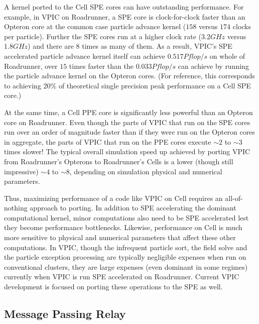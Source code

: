 \documentclass[letter,10pt]{article}
\begin{document}

A kernel ported to the Cell SPE cores can have outstanding
performance.  For example, in VPIC on Roadrunner, a SPE core is
clock-for-clock faster than an Opteron core at the common case
particle advance kernel ($158$ versus $174$ clocks per particle).
Further the SPE cores run at a higher clock rate ($3.2 GHz$ versus
$1.8 GHz$) and there are $8$ times as many of them.  As a result,
VPIC's SPE accelerated particle advance kernel itself can achieve
$0.517 Pflop/s$ on whole of Roadrunner, over $15$ times faster than
the $0.033 Pflop/s$ can achieve by running the particle advance kernel
on the Opteron cores.  (For reference, this corresponds to achieving
$20\%$ of theoretical single precision peak performance on a Cell SPE
core.)

At the same time, a Cell PPE core is significantly less powerful than
an Opteron core on Roadrunner.  Even though the parts of VPIC that run
on the SPE cores run over an order of magnitude faster than if they
were run on the Opteron cores in aggregate, the parts of VPIC that run
on the PPE cores execute $\sim 2$ to $\sim 3$ times slower!  The
typical overall simulation speed up achieved by porting VPIC from
Roadrunner's Opterons to Roadrunner's Cells is a lower (though still
impressive) $\sim 4$ to $\sim 8$, depending on simulation physical and
numerical parameters.


Thus, maximizing performance of a code like VPIC on Cell requires an
all-of-nothing approach to porting.  In addition to SPE accelerating
the dominant computational kernel, minor computations also need to be
SPE accelerated lest they become performance bottlenecks.  Likewise,
performance on Cell is much more sensitive to physical and numerical
parameters that affect these other computations.  In VPIC, though the
infrequent particle sort, the field solve and the particle exception
processing are typically negligible expenses when run on conventional
clusters, they are large expenses (even dominant in some regimes)
currently when VPIC is run SPE accelerated on Roadrunner.  Current
VPIC development is focused on porting these operations to the SPE as
well.

%
%
\subsection*{Message Passing Relay}
\end{document}
